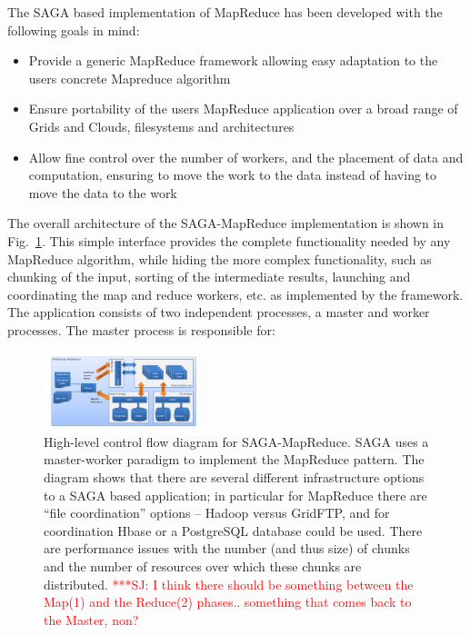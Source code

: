 \documentclass[conference,final]{IEEEtran}
\newcommand{\jhanote}[1]{ {\textcolor{red} { ***SJ: #1 }}}
\newcommand{\jhanote}[1]{}
\begin{document}
The SAGA based implementation of MapReduce has been developed with the
following goals in mind:

\begin{itemize}
\item Provide a generic MapReduce framework allowing easy
  adaptation to the users concrete Mapreduce algorithm
\item Ensure portability of the users MapReduce application over a
  broad range of Grids and Clouds, filesystems and architectures
\item Allow fine control over the number of workers, and the
  placement of data and computation, ensuring to move the work to the
  data instead of having to move the data to the work
\end{itemize}

The overall architecture of the SAGA-MapReduce implementation is shown
in Fig.~\ref{saga-mapreduce_controlflow}. This simple interface
provides the complete functionality needed by any MapReduce algorithm,
while hiding the more complex functionality, such as chunking of the
input, sorting of the intermediate results, launching and coordinating
the map and reduce workers, etc. as implemented by the framework.  The
application consists of two independent processes, a master and worker
processes. The master process is responsible for:

\begin{figure}[t]
      \centering
          \includegraphics[width=0.4\textwidth]{saga-mapreduce_controlflow.png}
          \caption{High-level control flow diagram for
            SAGA-MapReduce. SAGA uses a master-worker paradigm to
            implement the MapReduce pattern. The diagram shows that
            there are several different infrastructure options to a
            SAGA based application; in particular for MapReduce there
            are ``file coordination'' options -- Hadoop versus
            GridFTP, and for coordination Hbase or a PostgreSQL
            database could be used. There are performance issues with
            the number (and thus size) of chunks and the number of
            resources over which these chunks are distributed.
            \jhanote{I think there should be something between the
              Map(1) and the Reduce(2) phases.. something that comes
              back to the Master, non?}}
      \label{saga-mapreduce_controlflow}
\end{figure}
\end{document}
